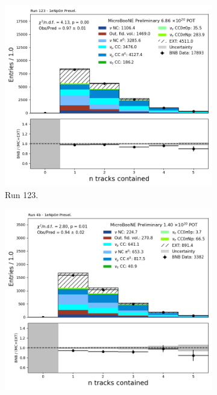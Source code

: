 \begin{figure}[H]
    \centering
    \begin{subfigure}[t]{0.32\linewidth}
        \includegraphics[width=\linewidth]{technote/Appendix_Preselection/Figures/1eNp0pi/Run123/n_tracks_contained_Run123_1eNp0pi_Presel.png}
        \caption{Run 123.}
    \end{subfigure}%
    \hspace{0.2cm}%
    \begin{subfigure}[t]{0.32\linewidth}
        \includegraphics[width=\linewidth]{technote/Appendix_Preselection/Figures/1eNp0pi/Run4b/n_tracks_contained_Run4b_1eNp0pi_Presel.png}

\end{subfigure}
\end{figure}
